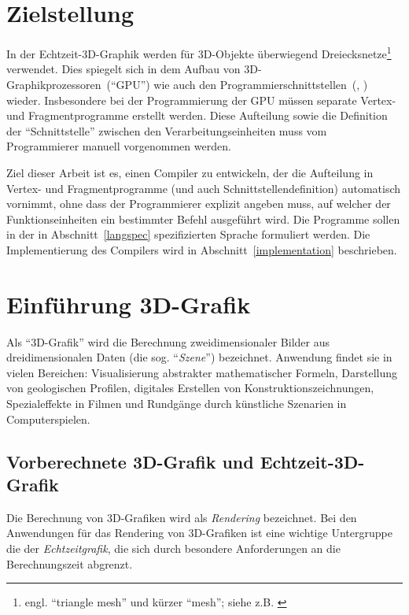 \documentclass[twoside,a4paper,fleqn,12pt]{article}
\begin{document}
\section{Zielstellung}

In der Echtzeit-3D-Graphik werden für 3D-Objekte überwiegend Dreiecksnetze\footnote{engl. ``triangle mesh'' und kürzer ``mesh''; siehe z.B. \cite{watt_de}}
verwendet. Dies spiegelt sich in dem Aufbau von 3D-Graphikprozessoren~("`GPU"') wie auch
den Programmierschnittstellen~(\cite{glspec4}, \cite{dx10}) wieder. Insbesondere bei der Programmierung der GPU müssen
separate Vertex- und Fragmentprogramme %
erstellt werden. Diese Aufteilung sowie die Definition der "`Schnittstelle"' zwischen den Verarbeitungseinheiten muss vom Programmierer manuell vorgenommen werden.

Ziel dieser Arbeit ist es, einen Compiler zu entwickeln, der die Aufteilung in Vertex- und Fragmentprogramme (und auch Schnittstellendefinition)
automatisch vornimmt,
ohne dass der Programmierer explizit angeben muss, auf welcher der Funktionseinheiten ein bestimmter Befehl ausgeführt wird.
Die Programme sollen in der in Abschnitt~\ref{langspec} spezifizierten Sprache formuliert werden.
Die Implementierung des Compilers wird in Abschnitt~\ref{implementation} beschrieben.


\section{Einführung 3D-Grafik}

Als "`3D-Grafik"' wird die Berechnung zweidimensionaler Bilder aus dreidimensionalen Daten (die sog. "`\emph{Szene}"')
 bezeichnet.
Anwendung findet sie in vielen Bereichen: Visualisierung abstrakter mathematischer Formeln, Darstellung
von geologischen Profilen, digitales Erstellen von Konstruktionszeichnungen, Spezialeffekte in Filmen und
Rundgänge durch künstliche Szenarien in Computerspielen. 

\subsection{Vorberechnete 3D-Grafik und Echtzeit-3D-Grafik}

Die Berechnung von 3D-Grafiken wird als \emph{Rendering} bezeichnet. Bei den Anwendungen für das Rendering
von 3D-Grafiken ist eine wichtige Untergruppe die der \emph{Echtzeitgrafik}, die sich durch besondere Anforderungen
an die Berechnungszeit abgrenzt.
\end{document}
